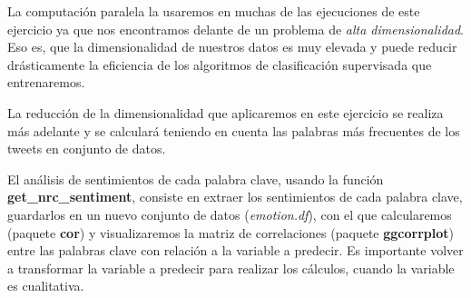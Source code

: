 \documentclass[]{article}
\newenvironment{Shaded}{\begin{snugshade}}{\end{snugshade}}
\newcommand{\CharTok}[1]{\textcolor[rgb]{0.31,0.60,0.02}{#1}}
\newcommand{\DataTypeTok}[1]{\textcolor[rgb]{0.13,0.29,0.53}{#1}}
\newcommand{\DecValTok}[1]{\textcolor[rgb]{0.00,0.00,0.81}{#1}}
\newcommand{\KeywordTok}[1]{\textcolor[rgb]{0.13,0.29,0.53}{\textbf{#1}}}
\newcommand{\NormalTok}[1]{#1}
\newcommand{\OperatorTok}[1]{\textcolor[rgb]{0.81,0.36,0.00}{\textbf{#1}}}
\newcommand{\OtherTok}[1]{\textcolor[rgb]{0.56,0.35,0.01}{#1}}
\newcommand{\StringTok}[1]{\textcolor[rgb]{0.31,0.60,0.02}{#1}}
\begin{document}
La computación paralela la usaremos en muchas de las ejecuciones de este
ejercicio ya que nos encontramos delante de un problema de \emph{alta
dimensionalidad}. Eso es, que la dimensionalidad de nuestros datos es
muy elevada y puede reducir drásticamente la eficiencia de los
algoritmos de clasificación supervisada que entrenaremos.

La reducción de la dimensionalidad que aplicaremos en este ejercicio se
realiza más adelante y se calculará teniendo en cuenta las palabras más
frecuentes de los tweets en conjunto de datos.

El análisis de sentimientos de cada palabra clave, usando la función
\textbf{get\_nrc\_sentiment}, consiste en extraer los sentimientos de
cada palabra clave, guardarlos en un nuevo conjunto de datos
(\emph{emotion.df}), con el que calcularemos (paquete \textbf{cor}) y
visualizaremos la matriz de correlaciones (paquete \textbf{ggcorrplot})
entre las palabras clave con relación a la variable a predecir. Es
importante volver a transformar la variable a predecir para realizar los
cálculos, cuando la variable es cualitativa.

\begin{Shaded}
\end{Shaded}
\end{document}
